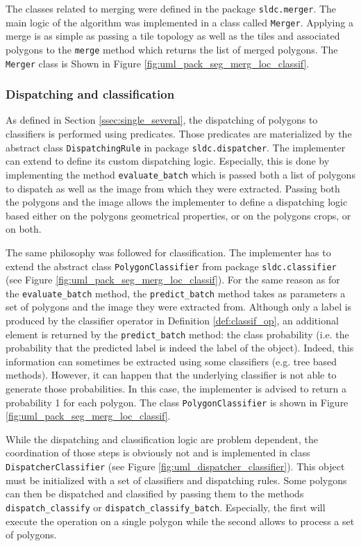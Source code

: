 The classes related to merging were defined in the package \texttt{sldc.merger}. The main logic of the algorithm was implemented in a class called \texttt{Merger}. Applying a merge is as simple as passing a tile topology as well as the tiles and associated polygons to the \texttt{merge} method which returns the list of merged polygons. The \texttt{Merger} class is Shown in Figure \ref{fig:uml_pack_seg_merg_loc_classif}.

\subsubsection{Dispatching and classification}
\label{sssec:dispatch}
As defined in Section \ref{ssec:single_several}, the dispatching of polygons to classifiers is performed using predicates. Those predicates are materialized by the abstract class \texttt{DispatchingRule} in package \texttt{sldc.dispatcher}. The implementer can extend to define its custom dispatching logic. Especially, this is done by implementing the method \texttt{evaluate\_batch} which is passed both a list of polygons to dispatch as well as the image from which they were extracted. Passing both the polygons and the image allows the implementer to define a dispatching logic based either on the polygons geometrical properties, or on the polygons crops, or on both.  

The same philosophy was followed for classification. The implementer has to extend the abstract class \texttt{PolygonClassifier} from package \texttt{sldc.classifier} (see Figure \ref{fig:uml_pack_seg_merg_loc_classif}). For the same reason as for the \texttt{evaluate\_batch} method, the \texttt{predict\_batch} method takes as parameters a set of polygons and the image they were extracted from. Although only a label is produced by the classifier operator in Definition \ref{def:classif_op}, an additional element is returned by the \texttt{predict\_batch} method: the class probability (i.e. the probability that the predicted label is indeed the label of the object). Indeed, this information can sometimes be extracted using some classifiers (e.g. tree based methods). However, it can happen that the underlying classifier is not able to generate those probabilities. In this case, the implementer is advised to return a probability 1 for each polygon. The class \texttt{PolygonClassifier} is shown in Figure \ref{fig:uml_pack_seg_merg_loc_classif}.

While the dispatching and classification logic are problem dependent, the coordination of those steps is obviously not and is implemented in class \texttt{DispatcherClassifier} (see Figure \ref{fig:uml_dispatcher_classifier}). This object must be initialized with a set of classifiers and dispatching rules. Some polygons can then be dispatched and classified by passing them to the methods \texttt{dispatch\_classify} or \texttt{dispatch\_classify\_batch}. Especially, the first will execute the operation on a single polygon while the second allows to process a set of polygons. 

